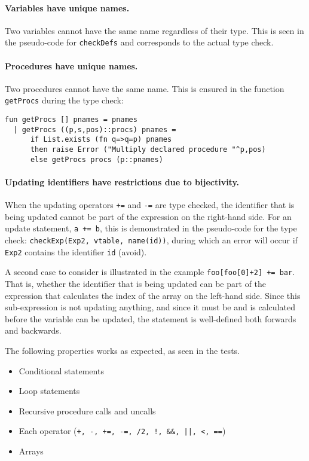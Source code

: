 \paragraph{Variables have unique names.} Two variables cannot have the same name
regardless of their type. This is seen in the pseudo-code for \verb+checkDefs+
and corresponds to the actual type check.

\paragraph{Procedures have unique names.} Two procedures cannot have the same
name. This is ensured in the function \verb+getProcs+ during the type check:

\begin{verbatim}
fun getProcs [] pnames = pnames
  | getProcs ((p,s,pos)::procs) pnames =
      if List.exists (fn q=>q=p) pnames
      then raise Error ("Multiply declared procedure "^p,pos)
      else getProcs procs (p::pnames)
\end{verbatim}

\paragraph{Updating identifiers have restrictions due to bijectivity.} When the
updating operators \verb!+=! and \verb!-=! are type checked, the identifier that
is being updated cannot be part of the expression on the right-hand side. For an
update statement, \verb!a += b!, this is demonstrated in the pseudo-code for the
type check: \verb+checkExp(Exp2, vtable, name(id))+, during which an error will
occur if \verb+Exp2+ contains the identifier \verb+id+ (avoid).

A second case to consider is illustrated in the example \verb!foo[foo[0]+2] += bar!.
That is, whether the identifier that is being updated can be part of the
expression that calculates the index of the array on the left-hand side. Since
this sub-expression is not updating anything, and since it must be and is
calculated before the variable can be updated, the statement is
well-defined both forwards and backwards.

\vspace{0.2cm}
The following properties works as expected, as seen in the tests.
\begin{itemize}
\item Conditional statements
\item Loop statements
\item Recursive procedure calls and uncalls
\item Each operator ({\tt +, -, +=, -=, /2, !, \&\&, ||,  <, ==})
\item Arrays
\end{itemize}
